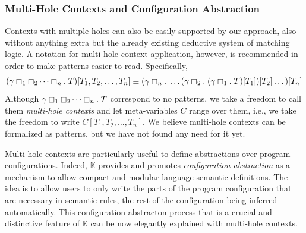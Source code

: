\documentclass[UTF8,11pt]{article}
\theoremstyle{plain}
\theoremstyle{definition}
\theoremstyle{remark}
\newcommand{\K}{\mbox{$\mathbb{K}$}\xspace}
\newcommand{\hole}{\boxempty}
\begin{document}
\subsubsection{Multi-Hole Contexts and Configuration Abstraction}
\label{sec:cfg-abstraction}

Contexts with multiple holes can also be easily supported by our approach,
also without anything extra but the already existing deductive system of
matching logic.
A notation for multi-hole context application, however, is recommended in
order to make patterns easier to read. Specifically,
$$
(\gamma \hole_1 \hole_2 \dots \hole_n . \; T)[T_1,T_2,\dots,T_n]
\equiv (\gamma \hole_n .\; \dots (\gamma\hole_2.\;(\gamma\hole_1.\;T)[T_1])[T_2]\dots)[T_n]
$$
Although $\gamma \hole_1 \hole_2 \dots \hole_n . \; T$ correspond to no
patterns, we take a freedom to call them \emph{multi-hole contexts} and
let meta-variables $C$ range over them, i.e., we take the freedom to write
$C[T_1,T_2,\dots,T_n]$.
We believe multi-hole contexts can be formalized as patterns, but we have
not found any need for it yet.

Multi-hole contexts are particularly useful to define abstractions over
program configurations.
Indeed, \K provides and promotes \emph{configuration abstraction} as a
mechanism to allow compact and modular language semantic definitions.
The idea is to allow users to only write the parts of the program
configuration that are necessary in semantic rules, the rest of the
configuration being inferred automatically.
This configuration abstracton process that is a crucial and distinctive
feature of \K can be now elegantly explained with multi-hole contexts.
\end{document}
